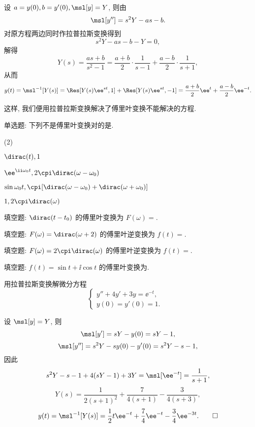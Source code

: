 \begin{solution}
  设 $a=y(0),b=y'(0),\msl[y]=Y$, 则由\thmLDif
  \[
    \msl[y'']=s^2Y-as-b.
  \]
  对原方程两边同时作拉普拉斯变换得到
  \[
    s^2Y-as-b-Y=0,
  \]
  解得
  \[
     Y(s)
    =\frac{as+b}{s^2-1}
    =\frac{a+b}2\cdot\frac1{s-1}+\frac{a-b}2\cdot\frac1{s+1},
  \]
  从而
  \[
     y(t)
    =\msl^{-1}[Y(s)]
    =\Res[Y(s)\ee^{st},1]+\Res[Y(s)\ee^{st},-1]
    =\frac{a+b}2\ee^t+\frac{a-b}2\ee^{-t}.
  \]
\end{solution}

这样, 我们便用拉普拉斯变换解决了傅里叶变换不能解决的方程.




\begin{exercise}
单选题: 下列不是傅里叶变换对的是\fillbrace{}.
\begin{exchoice}(2)
  \item $\dirac(t),1$
  \item $\ee^{\ii \omega_0t},2\cpi\dirac(\omega-\omega_0)$
  \item $\sin \omega_0t, \cpi[\dirac(\omega-\omega_0)+\dirac(\omega+\omega_0)]$
  \item $1,2\cpi\dirac(\omega)$
\end{exchoice}
\end{exercise}


\begin{exercise}
填空题: $\dirac(t-t_0)$ 的傅里叶变换为 $F(\omega)=$.
\end{exercise}


\begin{exercise}
填空题: $F(\omega)=\dirac(\omega+2)$ 的傅里叶逆变换为 $f(t)=$.
\end{exercise}


\begin{exercise}
填空题: $F(\omega)=2\cpi\dirac(\omega)$ 的傅里叶逆变换为 $f(t)=$.
\end{exercise}


\begin{exercise}
填空题: $f(t)=\sin t+\ii \cos t$ 的傅里叶变换为.
\end{exercise}


\begin{exercise}
用拉普拉斯变换解微分方程
\[\begin{cases}y''+4y'+3y=\ee^{-t},&\\y(0)=y'(0)=1.\end{cases}\]
\end{exercise}
\begin{solution}
设 $\msl[y]=Y$, 则
\[\msl[y']=sY-y(0)=sY-1,\]
\[\msl[y'']=s^2Y-sy(0)-y'(0)=s^2Y-s-1,\]
因此
\[s^2Y-s-1+4(sY-1)+3Y=\msl[\ee^{-t}]=\frac{1}{s+1},\]
\[Y(s)=\frac{1}{2(s+1)^2}+\frac{7}{4(s+1)}-\frac3{4(s+3)},\]
\[y(t)=\msl^{-1}[Y(s)]=\frac12 t\ee^{-t}+\frac74 \ee^{-t}-\frac34 \ee^{-3t}. \qedhere\]
\end{solution}


